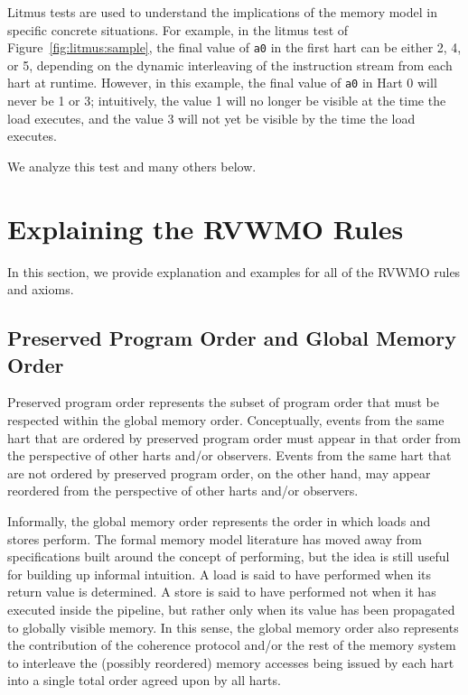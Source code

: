 Litmus tests are used to understand the implications of the memory model in specific concrete situations.
For example, in the litmus test of Figure~\ref{fig:litmus:sample}, the final value of {\tt a0} in the first hart can be either 2, 4, or 5, depending on the dynamic interleaving of the instruction stream from each hart at runtime.
However, in this example, the final value of {\tt a0} in Hart 0 will never be 1 or 3; intuitively, the value 1 will no longer be visible at the time the load executes, and the value 3 will not yet be visible by the time the load executes.

We analyze this test and many others below.

\section{Explaining the RVWMO Rules}
In this section, we provide explanation and examples for all of the RVWMO rules and axioms.

\subsection{Preserved Program Order and Global Memory Order}
Preserved program order represents the subset of program order that must be respected within the global memory order.
Conceptually, events from the same hart that are ordered by preserved program order must appear in that order from the perspective of other harts and/or observers.
Events from the same hart that are not ordered by preserved program order, on the other hand, may appear reordered from the perspective of other harts and/or observers.

Informally, the global memory order represents the order in which loads and stores perform.
The formal memory model literature has moved away from specifications built around the concept of performing, but the idea is still useful for building up informal intuition.
A load is said to have performed when its return value is determined.
A store is said to have performed not when it has executed inside the pipeline, but rather only when its value has been propagated to globally visible memory.
In this sense, the global memory order also represents the contribution of the coherence protocol and/or the rest of the memory system to interleave the (possibly reordered) memory accesses being issued by each hart into a single total order agreed upon by all harts.

